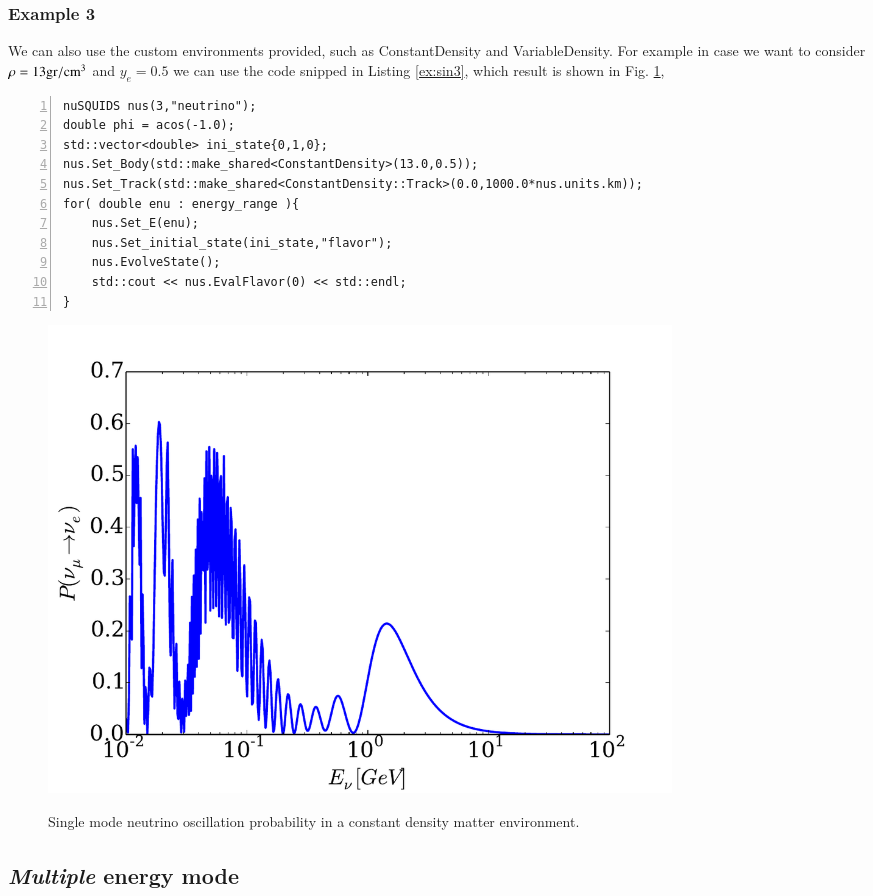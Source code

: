 \documentclass[3p,12pt]{elsarticle}
\newcommand{\ttf}{\ttfamily}
\begin{document}
\subsubsection{Example 3}

We can also use the custom environments provided, such as {\ttf ConstantDensity} and {\ttf VariableDensity}. For example in case we want to consider $\rho = 13 {\rm gr}/{\rm cm}^3$ and $y_e = 0.5$ we can use the code snipped in Listing \ref{ex:sin3}, which result is shown in Fig. \ref{fig:nu_mu_nue_single_energy},

\begin{lstlisting}[frame=leftline, numbers = left,breaklines=true, label = ex:sin3]
nuSQUIDS nus(3,"neutrino");
double phi = acos(-1.0);
std::vector<double> ini_state{0,1,0};
nus.Set_Body(std::make_shared<ConstantDensity>(13.0,0.5));
nus.Set_Track(std::make_shared<ConstantDensity::Track>(0.0,1000.0*nus.units.km));
for( double enu : energy_range ){
	nus.Set_E(enu);
	nus.Set_initial_state(ini_state,"flavor");
	nus.EvolveState();
	std::cout << nus.EvalFlavor(0) << std::endl;
}
\end{lstlisting}

\begin{figure}[ht]
\begin{center}
\label{fig:nu_mu_nue_single_energy}
\includegraphics[width=0.8\textwidth]{./fig/nu_mu_nue_single_energy.pdf}
\caption{Single mode neutrino oscillation probability in a constant density matter environment.}
\end{center}
\end{figure}

\subsection{{\it Multiple} energy mode}
\end{document}
